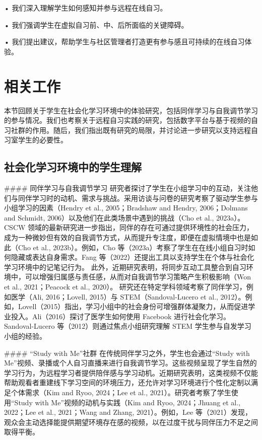 \documentclass[12pt]{ctexart}
\begin{document}
• 我们深入理解学生如何感知并参与远程在线自习。

• 我们强调学生在虚拟自习前、中、后所面临的关键障碍。

• 我们提出建议，帮助学生与社区管理者打造更有参与感且可持续的在线自习体验。

\section{相关工作}
本节回顾关于学生在社会化学习环境中的体验研究，包括同伴学习与自我调节学习的参与情况。我们也考察关于远程自习实践的研究，包括数字平台与基于视频的自习社群的作用。随后，我们指出既有研究的局限，并讨论进一步研究以支持远程自习室学生的必要性。

\subsection{社会化学习环境中的学生理解}
\#\#\#\# 同伴学习与自我调节学习
研究者探讨了学生在小组学习中的互动，关注他们与同伴学习时的动机、需求与挑战。采用访谈与问卷的研究考察了驱动学生参与小组学习的因素（Hendry et al., 2005；Bradshaw and Hendry, 2006；Dolmans and Schmidt, 2006）以及他们在此类场景中遇到的挑战（Cho et al., 2023a）。
CSCW 领域的最新研究进一步指出，同伴的存在可通过提供环境性的社会压力，成为一种微妙但有效的自我调节方式，从而提升专注度，即便在虚拟情境中也是如此（Cho et al., 2023b）。例如，Cho 等（2023a）考察了学生在在线小组自习时如何隐藏或表达自身需求。Fang 等（2022）还提出工具以支持学生在个体与社会化学习环境中的记笔记行为。
此外，近期研究表明，将同步互动工具整合到自习环境中，可以增强归属感与责任感，从而对自我调节学习策略产生积极影响（Won et al., 2021；Peacock et al., 2020）。
研究还在特定学科领域考察了同伴学习，例如医学（Ali, 2016；Lovell, 2015）与 STEM（Sandoval-Lucero et al., 2012）。例如，Lovell（2015）指出，学习小组中的社会身份可增强群体凝聚力，从而促进学业投入。Ali（2016）探讨了医学生如何使用 Facebook 进行社会化学习。Sandoval-Lucero 等（2012）则通过焦点小组研究理解 STEM 学生参与自发学习小组的经验。

\#\#\#\# “Study with Me”社群
在传统同伴学习之外，学生也会通过“Study with Me”视频、录播或个人自习直播来进行自我调节学习。这些视频呈现了学生自然的学习行为，为远程学习者提供陪伴感与学习动机。近期研究表明，这类视频不仅能帮助观看者重建线下学习空间的环境压力，还允许对学习环境进行个性化定制以满足个体需求（Kim and Ryoo, 2024；Lee et al., 2021）。研究者考察了学生使用“Study with Me”视频的动机与实践（Kim and Ryoo, 2024；Jhuang et al., 2022；Lee et al., 2021；Wang and Zhang, 2021）。例如，Lee 等（2021）发现，观众会主动选择能提供期望环境存在感的视频，以在过度干扰与同伴压力不足之间取得平衡。
\end{document}

